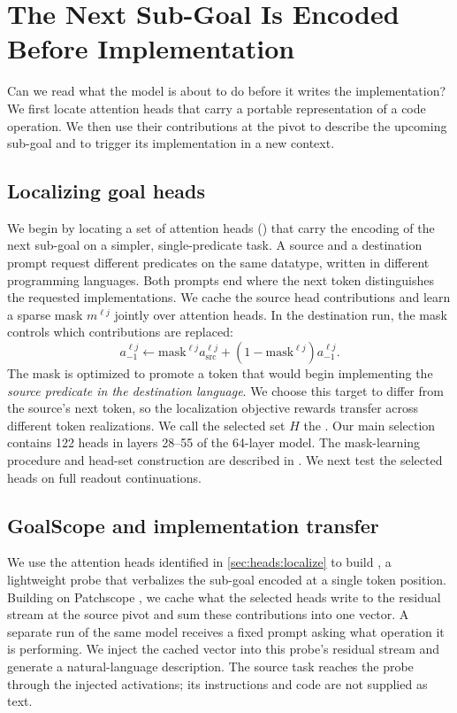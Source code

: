 \section{The Next Sub-Goal Is Encoded Before Implementation}
\label{sec:what}
Can we read what the model is about to do before it writes the implementation? We first locate attention heads that carry a portable representation of a code operation. We then use their contributions at the pivot to describe the upcoming sub-goal and to trigger its implementation in a new context.

\subsection{Localizing goal heads}
\label{sec:what:approach}
\label{sec:heads:localize}
We begin by locating a set of attention heads (\goalheads) that carry the encoding of the next sub-goal on a simpler, single-predicate task. A source and a destination prompt request different predicates on the same datatype, written in different programming languages. Both prompts end where the next token distinguishes the requested implementations. We cache the source head contributions and learn a sparse mask $m^{\ell j}$ jointly over attention heads. In the destination run, the mask controls which contributions are replaced:
\begin{equation}
a_{-1}^{\ell j}\leftarrow \mathrm{mask}^{\ell j}a_{\mathrm{src}}^{\ell j}+(1-\mathrm{mask}^{\ell j})a_{-1}^{\ell j}.
\label{eqn:opt-int}
\end{equation}
The mask is optimized to promote a token that would begin implementing the \emph{source predicate in the destination language}. We choose this target to differ from the source's next token, so the localization objective rewards transfer across different token realizations. We call the selected set $H$ the \goalheads. Our main selection contains 122 heads in layers 28--55 of the 64-layer model. The mask-learning procedure and head-set construction are described in . We next test the selected heads on full readout continuations.

\subsection{GoalScope and implementation transfer}
\label{sec:what:readout}
We use the attention heads identified in \ref{sec:heads:localize} to build \goalscope, a lightweight probe that verbalizes the sub-goal encoded at a single token position. Building on Patchscope \citep{ghandeharioun2024patchscope}, we cache what the selected heads write to the residual stream at the source pivot and sum these contributions into one vector. A separate run of the same model receives a fixed prompt asking what operation it is performing. We inject the cached vector into this probe's residual stream and generate a natural-language description. The source task reaches the probe through the injected activations; its instructions and code are not supplied as text.

